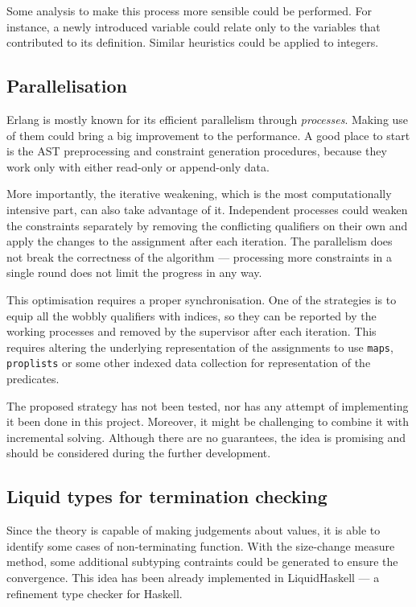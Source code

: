 Some analysis to make this process more sensible could be performed. For
instance, a newly introduced variable could relate only to the variables that
contributed to its definition. Similar heuristics could be applied to integers.

\subsection{Parallelisation}

Erlang is mostly known for its efficient parallelism through \emph{processes}.
Making use of them could bring a big improvement to the performance. A good
place to start is the AST preprocessing and constraint generation procedures,
because they work only with either read-only or append-only data.

More importantly, the iterative weakening, which is the most computationally
intensive part, can also take advantage of it. Independent processes could
weaken the constraints separately by removing the conflicting qualifiers on
their own and apply the changes to the assignment after each iteration. The
parallelism does not break the correctness of the algorithm --- processing more
constraints in a single round does not limit the progress in any way.

This optimisation requires a proper synchronisation. One of the strategies is to
equip all the wobbly qualifiers with indices, so they can be reported by the
working processes and removed by the supervisor after each iteration. This
requires altering the underlying representation of the assignments to use
\texttt{maps}, \texttt{proplists} or some other indexed data collection for
representation of the predicates.

The proposed strategy has not been tested, nor has any attempt of implementing
it been done in this project. Moreover, it might be challenging to combine it
with incremental solving. Although there are no guarantees, the idea is
promising and should be considered during the further development.

\subsection{Liquid types for termination checking}

Since the theory is capable of making judgements about values, it is able to
identify some cases of non-terminating function. With the size-change measure
\cite{10.1145/373243.360210, Sereni05terminationanalysis} method, some
additional subtyping contraints could be generated to ensure the convergence.
This idea has been already implemented in LiquidHaskell
\cite{vazou2014refinement} --- a refinement type checker for Haskell.

